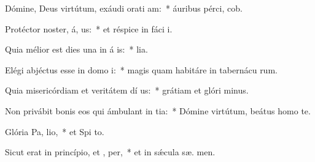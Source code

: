 \item Dómine, Deus virtútum, exáudi orati am:~* áuribus pérci,  cob.
\item Protéctor noster, á, us:~* et réspice in fáci  i.
\item Quia mélior est dies una in á is:~*  lia.
\item Elégi abjéctus esse in domo  i:~* magis quam habitáre in tabernácu rum.
\item Quia misericórdiam et veritátem dí us:~* grátiam et glóri  minus.
\item Non privábit bonis eos qui ámbulant in tia:~* Dómine virtútum, beátus homo    te.
\item Glória Pa,  lio,~* et Spi to.
\item Sicut erat in princípio, et ,  per,~* et in sǽcula sæ. men.
